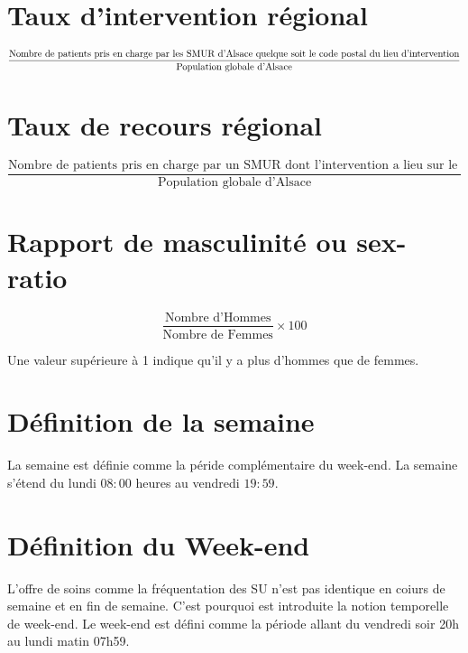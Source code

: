 \documentclass[12pt,english,french,twoside]{report}\usepackage[]{graphicx}\usepackage[]{color}
\begin{document}
\section*{Taux d'intervention régional}
\begin{displaymath}
    \frac{\text{Nombre de patients pris en charge par les SMUR d'Alsace}\linebreak[4] \text{ quelque soit le code postal du lieu d'intervention}}{\text{Population globale d'Alsace}}
  \end{displaymath}

\section*{Taux de recours régional}
\begin{displaymath}
    \frac{\text{Nombre de patients pris en charge par un SMUR dont l'intervention a lieu sur le territoire régional }}{\text{Population globale d'Alsace}}
  \end{displaymath}

\section*{Rapport de masculinité ou sex-ratio}
\begin{displaymath}
    \frac{\text{Nombre d'Hommes}}{\text{Nombre de Femmes}} \times 100
\end{displaymath}

Une valeur supérieure à 1 indique qu'il y a plus d'hommes que de femmes.

\section*{Définition de la semaine}
La semaine est définie comme la péride complémentaire du week-end. La semaine s'étend du lundi $08:00$ heures au vendredi $19:59$.

\section*{Définition du Week-end}
L'offre de soins comme la fréquentation des SU n'est pas identique en coiurs de semaine et en fin de semaine. C'est pourquoi est introduite la notion temporelle de week-end.
Le week-end est défini comme la période allant du vendredi soir 20h au lundi matin 07h59.
\end{document}

